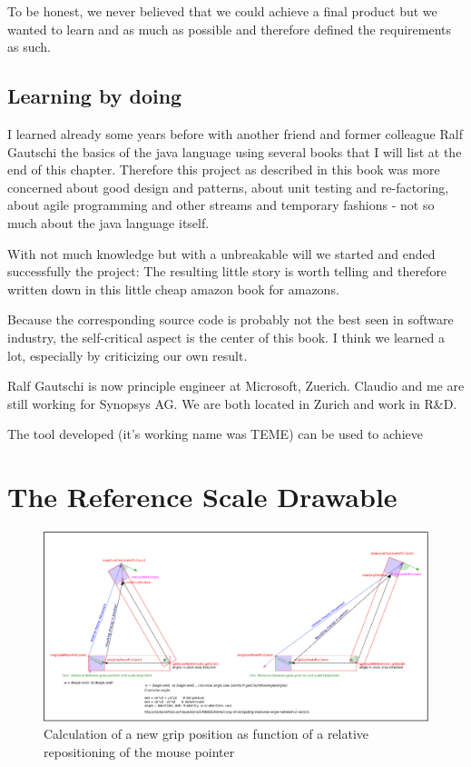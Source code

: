 \documentclass[a4paper]{book}
\begin{document}
To be honest, we never believed that we could achieve a final product but we wanted to learn and as much as possible and therefore defined the requirements as such. 

\section{Learning by doing}

I learned already some years before with another friend and former colleague Ralf Gautschi the basics of the java language using several books that I will list at the end of this chapter. Therefore this project as described in this book was more concerned about good design and patterns, about unit testing and re-factoring, about agile programming and other streams and temporary fashions - not so much about the java language itself. 

With not much knowledge but with a unbreakable will we started and ended successfully the project: The resulting little story is worth telling and therefore written down in this little cheap amazon book for amazons.

Because the corresponding source code is probably not the best seen in software industry,  the self-critical aspect is the center of this book. I think we learned a lot, especially by criticizing our own result.



Ralf Gautschi is now principle engineer at Microsoft, Zuerich. Claudio and me are still working for Synopsys AG. We are both located in Zurich and work in R\&D. 
   
   
The tool developed (it's working name was TEME) can be used to achieve
   
   
\chapter{The Reference Scale Drawable}

    

	\begin{figure}[htbp]
  		\centering
  		\includegraphics[width=\textwidth]{scaleDescription.eps}
  		\caption{Calculation of a new grip position as function of a relative repositioning of the mouse 	pointer}
	\end{figure}
\end{document}
